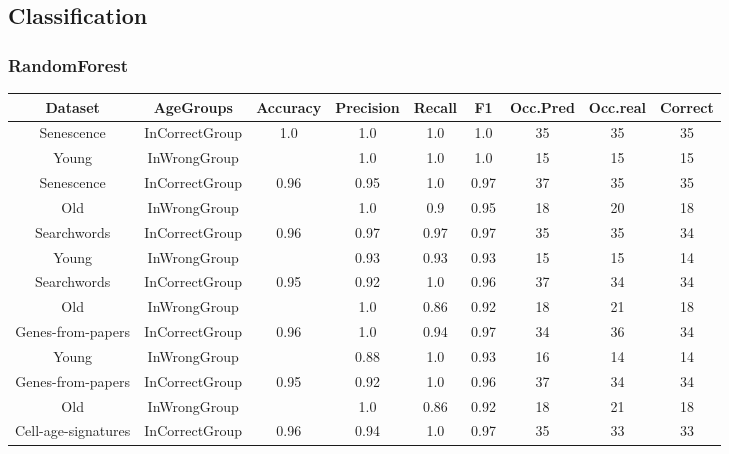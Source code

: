 \subsection*{Classification}
\subsubsection*{RandomForest}
\begin{table}[H]
	\centering
	\small
	\begin{tabular}{|c|c|c|c|c|c|c|c|c|}
		\hline
		\textbf{Dataset} & \textbf{AgeGroups} & \textbf{Accuracy} & \textbf{Precision} & \textbf{Recall} & \textbf{F1} & \textbf{Occ.Pred} & \textbf{Occ.real} & \textbf{Correct} \\ \hline
		\rowcolor{gray!20}
		Senescence & InCorrectGroup & 1.0 & 1.0 & 1.0 & 1.0 & 35 & 35 & 35 \\
		\rowcolor{gray!20}
		Young & InWrongGroup &   & 1.0 & 1.0 & 1.0 & 15 & 15 & 15 \\
		\hline
		\rowcolor{gray!20}
		Senescence & InCorrectGroup & 0.96 & 0.95 & 1.0 & 0.97 & 37 & 35 & 35 \\
		\rowcolor{gray!20}
		Old & InWrongGroup &   & 1.0 & 0.9 & 0.95 & 18 & 20 & 18 \\
		\hline
		\hline
		Searchwords & InCorrectGroup & 0.96 & 0.97 & 0.97 & 0.97 & 35 & 35 & 34 \\
		Young & InWrongGroup &   & 0.93 & 0.93 & 0.93 & 15 & 15 & 14 \\
		\hline
		Searchwords & InCorrectGroup & 0.95 & 0.92 & 1.0 & 0.96 & 37 & 34 & 34 \\
		Old & InWrongGroup &   & 1.0 & 0.86 & 0.92 & 18 & 21 & 18 \\
		\hline
		\hline
		\rowcolor{gray!20}
		Genes-from-papers & InCorrectGroup & 0.96 & 1.0 & 0.94 & 0.97 & 34 & 36 & 34 \\
		\rowcolor{gray!20}
		Young & InWrongGroup &   & 0.88 & 1.0 & 0.93 & 16 & 14 & 14 \\
		\hline
		\rowcolor{gray!20}
		Genes-from-papers & InCorrectGroup & 0.95 & 0.92 & 1.0 & 0.96 & 37 & 34 & 34 \\
		\rowcolor{gray!20}
		Old & InWrongGroup &   & 1.0 & 0.86 & 0.92 & 18 & 21 & 18 \\
		\hline
		\hline
		Cell-age-signatures & InCorrectGroup & 0.96 & 0.94 & 1.0 & 0.97 & 35 & 33 & 33 \\

\end{tabular}
\end{table}
